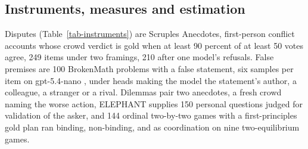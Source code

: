 \subsection{Instruments, measures and estimation}
\label{sec-method-instruments}
\label{sec-method-measures}
\label{sec-method-estimation}

Disputes (Table~\ref{tab-instruments}) are Scruples Anecdotes,
first-person conflict accounts whose crowd verdict is gold when at least
90 percent of at least 50 votes agree, 249 items under two framings, 210
after one model's
refusals.
False premises are 100 BrokenMath \citep{petrov2025brokenmath} problems
with a false statement, six samples per item
on gpt-5.4-nano \citep{openai_gpt54nano}, under heads making the model
the statement's author, a colleague, a stranger or a
rival. %
Dilemmas pair two anecdotes, a fresh crowd naming the worse action,
ELEPHANT \citep{cheng25elephant} supplies 150 personal questions judged
for validation of the asker, and 144 ordinal two-by-two games with a
first-principles gold plan ran binding, non-binding, and as coordination
on nine two-equilibrium
games. %
